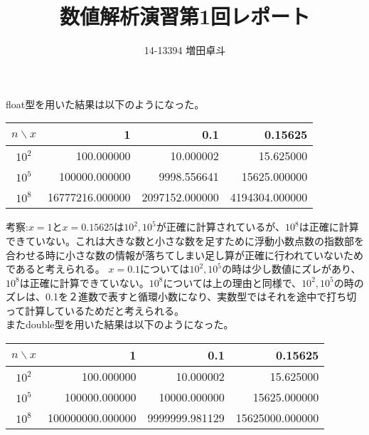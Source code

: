 \documentclass[11pt,a4paper]{jsarticle}
\begin{document}
\title{数値解析演習第1回レポート}
\author{14-13394 増田卓斗}
\date{}
\maketitle

\section{}
float型を用いた結果は以下のようになった。
\begin{table}[htb]
  \begin{tabular}{|c||r|r|r|} \hline
    $n \backslash x$ & 1 & 0.1 & 0.15625 \\ \hline \hline
    $10^2$ & 100.000000 & 10.000002 & 15.625000 \\ \hline
    $10^5$ & 100000.000000 & 9998.556641 & 15625.000000 \\ \hline
    $10^8$ & 16777216.000000 & 2097152.000000 & 4194304.000000 \\ \hline
  \end{tabular}
\end{table}

考察:$x=1$と$x=0.15625$は$10^2,10^5$が正確に計算されているが、$10^8$は正確に計算できていない。これは大きな数と小さな数を足すために浮動小数点数の指数部を合わせる時に小さな数の情報が落ちてしまい足し算が正確に行われていないためであると考えられる。
$x=0.1$については$10^2,10^5$の時は少し数値にズレがあり、$10^8$は正確に計算できていない。$10^8$については上の理由と同様で、$10^2,10^5$の時のズレは、0.1を２進数で表すと循環小数になり、実数型ではそれを途中で打ち切って計算しているためだと考えられる。\\


またdouble型を用いた結果は以下のようになった。
\begin{table}[htb]
  \begin{tabular}{|c||r|r|r|} \hline
    $n \backslash x$ & 1 & 0.1 & 0.15625 \\ \hline \hline
    $10^2$ & 100.000000 & 10.000002 & 15.625000 \\ \hline
    $10^5$ & 100000.000000 & 10000.000000 & 15625.000000 \\ \hline
    $10^8$ & 100000000.000000 & 9999999.981129 & 15625000.000000 \\ \hline
  \end{tabular}
\end{table}
\end{document}
